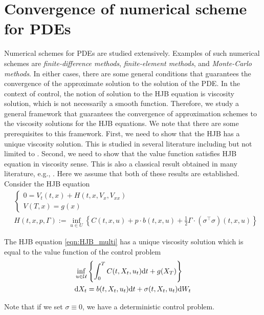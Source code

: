 \documentclass[11pt]{book}
\newcommand{\dt}{\text{\normalfont d}t}
\newcommand{\dX}{\text{\normalfont d}X}
\newcommand{\dW}{\text{\normalfont d}W}
\begin{document}
\section{Convergence of numerical scheme for PDEs}
Numerical schemes for PDEs are studied extensively. Examples of such numerical schemes are \emph{finite-difference methods}, \emph{finite-element methods}, and \emph{Monte-Carlo methods}. In either cases, there are some general conditions that guarantees the convergence of the approximate solution to the solution of the PDE. In the context of control, the notion of solution to the HJB equation is viscosity solution, which is not necessarily a smooth function. Therefore, we study a general framework that guarantees the convergence of approximation schemes to the viscosity solutions for the HJB equations. We note that there are some prerequisites to this framework. First, we need to show that the HJB has a unique viscosity solution. This is studied in several literature including but not limited to \cite{CIL92,Fleming-Soner-book-06,Touzi12}. Second, we need to show that the value function satisfies HJB equation in viscosity sense. This is also a classical result obtained in many literature, e.g., \citet{Fleming-Soner-book-06,Touzi12}. Here we assume that both of these results are established. Consider the HJB equation
\begin{align}
     &\begin{cases}
    0= V_t(t,x) + H(t,x,V_x,V_{xx})\\
    V(T,x)=g(x)
\end{cases}\label{eqn:HJB_multi}\\
&\hspace{0cm}H(t,x,p,\Gamma):=\inf_{u\in U}\left\{ C(t,x,u)  + p\cdot b(t,x,u)+\frac12 \Gamma\cdot  (\sigma^\top\sigma)(t,x,u)\right\}\label{eqn:Hamilton_multi}
\end{align}
\begin{assp}
    The HJB equation \eqref{eqn:HJB_multi} has a unique viscosity solution which is equal to the value function of the control problem 
    \[
    \begin{split}
    &\inf_{u\in\mathcal{U}}\left\{\int_0^TC(t,X_t,u_t)\dt+g(X_T)\right\}\\
        &\dX_t = b(t,X_t,u_t)\dt+\sigma(t,X_t,u_t)\dW_t
    \end{split}
    \]
    \end{assp}
    Note that if we set $\sigma\equiv0$, we have a deterministic control problem. 
\end{document}
